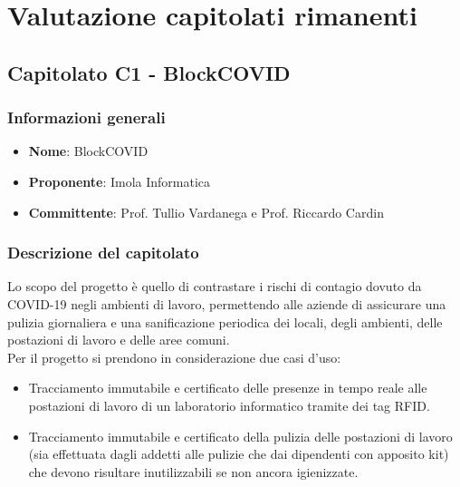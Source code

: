 \section{Valutazione capitolati rimanenti}

	\subsection{Capitolato C1 - BlockCOVID}
		\subsubsection{Informazioni generali}
			\begin{itemize}
				\item\textbf{Nome}: BlockCOVID
				\item\textbf{Proponente}: Imola Informatica
				\item\textbf{Committente}: Prof. Tullio Vardanega e Prof. Riccardo Cardin
			\end{itemize}
			
		\subsubsection{Descrizione del capitolato}
			Lo scopo del progetto è quello di contrastare i rischi di contagio dovuto da COVID-19 negli ambienti di lavoro, permettendo alle aziende di assicurare una pulizia giornaliera e una sanificazione periodica dei locali, degli ambienti, delle postazioni di lavoro e delle aree comuni.\\
			Per il progetto si prendono in considerazione due casi d’uso:\\
			\begin{itemize}
				\item Tracciamento immutabile e certificato delle presenze in tempo reale alle postazioni di lavoro di un laboratorio informatico tramite dei tag RFID.
				\item Tracciamento immutabile e certificato della pulizia delle postazioni di lavoro (sia effettuata dagli addetti alle pulizie che dai dipendenti con apposito kit) che devono risultare inutilizzabili se non ancora igienizzate.
			\end{itemize}
